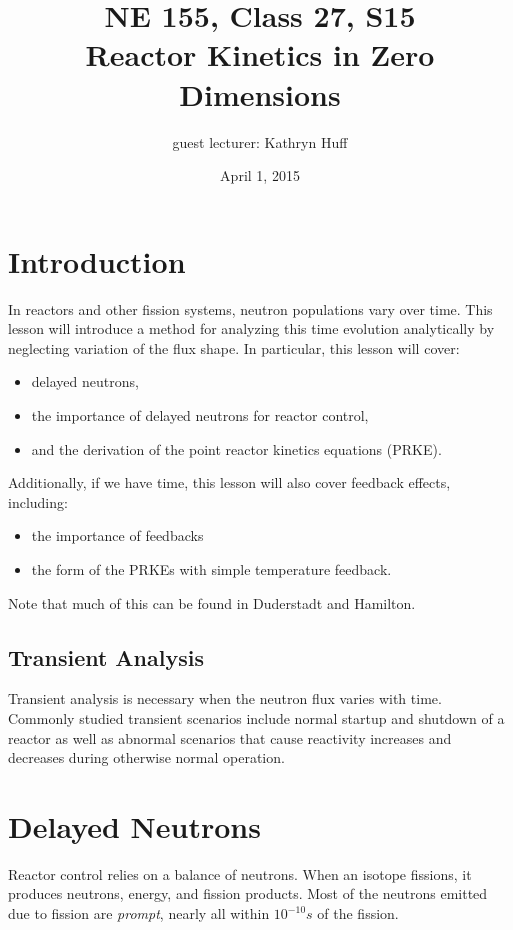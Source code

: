 \documentclass[12pt]{article}
\title{NE 155, Class 27, S15 \\
Reactor Kinetics in Zero Dimensions}
\date{April 1, 2015}
\begin{document}
\author{guest lecturer: Kathryn Huff}
\maketitle

\hrulefill

\section{Introduction}

In reactors and other fission systems, neutron populations vary over time. This 
lesson will introduce a method for analyzing this time evolution analytically 
by neglecting variation of the flux shape. In particular, this lesson will 
cover:

\begin{itemize}
\item delayed neutrons,
\item the importance of delayed neutrons for reactor control,
\item and the derivation of the point reactor kinetics equations (PRKE).
\end{itemize}

Additionally, if we have time, this lesson will also cover feedback effects, 
including: 
\begin{itemize}
\item the importance of feedbacks
\item the form of the PRKEs with simple temperature feedback.
\end{itemize}

Note that much of this can be found in Duderstadt and Hamilton.

\subsection{Transient Analysis}

Transient analysis is necessary when the neutron flux varies with time.
Commonly studied transient scenarios include normal startup and shutdown of a
reactor as well as abnormal scenarios that cause reactivity increases and
decreases during otherwise normal operation.

\section{Delayed Neutrons}
Reactor control relies on a balance of neutrons. When an isotope fissions, it 
produces neutrons, energy, and fission products.  Most of the neutrons emitted 
due to fission are \emph{prompt}, nearly all within $10^{-10}s$ of the fission. 
\end{document}
